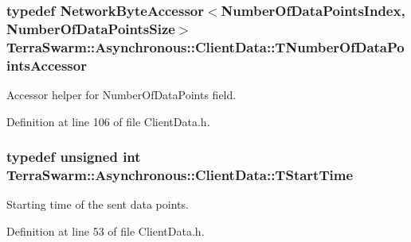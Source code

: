 \hypertarget{class_terra_swarm_1_1_asynchronous_1_1_client_data_a5a4bdd7c49a72f585ba8c0216a241bb8}{
\subsubsection[{T\-Number\-Of\-Data\-Points\-Accessor}]{\setlength{\rightskip}{0pt plus 5cm}typedef {\bf Network\-Byte\-Accessor}$<${\bf Number\-Of\-Data\-Points\-Index}, {\bf Number\-Of\-Data\-Points\-Size}$>$ {\bf Terra\-Swarm\-::\-Asynchronous\-::\-Client\-Data\-::\-T\-Number\-Of\-Data\-Points\-Accessor}\hspace{0.3cm}{\ttfamily [private]}}}\label{class_terra_swarm_1_1_asynchronous_1_1_client_data_a5a4bdd7c49a72f585ba8c0216a241bb8}


Accessor helper for Number\-Of\-Data\-Points field. 



Definition at line 106 of file Client\-Data.\-h.

\hypertarget{class_terra_swarm_1_1_asynchronous_1_1_client_data_a70b07646d3a13d9c2cb16ade44a49966}{
\subsubsection[{T\-Start\-Time}]{\setlength{\rightskip}{0pt plus 5cm}typedef unsigned int {\bf Terra\-Swarm\-::\-Asynchronous\-::\-Client\-Data\-::\-T\-Start\-Time}}}\label{class_terra_swarm_1_1_asynchronous_1_1_client_data_a70b07646d3a13d9c2cb16ade44a49966}


Starting time of the sent data points. 



Definition at line 53 of file Client\-Data.\-h.

